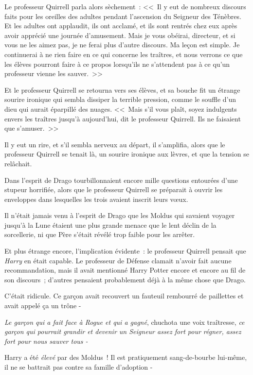 Le professeur Quirrell parla alors sèchement~: <<~Il y eut de nombreux discours faits pour les oreilles des adultes pendant l'ascension du Seigneur des Ténèbres. Et les adultes ont applaudit, ils ont acclamé, et ils sont rentrés chez eux après avoir apprécié une journée d'amusement. Mais je vous obéirai, directeur, et si vous ne les aimez pas, je ne ferai plus d'autre discours. Ma leçon est simple. Je continuerai à ne rien faire en ce qui concerne les traîtres, et nous verrons ce que les élèves pourront faire à ce propos lorsqu'ils ne s'attendent pas à ce qu'un professeur vienne les sauver.~>>

Et le professeur Quirrell se retourna vers ses élèves, et sa bouche fit un étrange sourire ironique qui sembla dissiper la terrible pression, comme le souffle d'un dieu qui aurait éparpillé des nuages. <<~Mais s'il vous plaît, soyez indulgents envers les traîtres jusqu'à aujourd'hui, dit le professeur Quirrell. Ils ne faisaient que s'amuser.~>>

Il y eut un rire, et s'il sembla nerveux au départ, il s'amplifia, alors que le professeur Quirrell se tenait là, un sourire ironique aux lèvres, et que la tension se relâchait.

\later

Dans l'esprit de Drago tourbillonnaient encore mille questions entourées d'une stupeur horrifiée, alors que le professeur Quirrell se préparait à ouvrir les enveloppes dans lesquelles les trois avaient inscrit leurs vœux.

Il n'était jamais venu à l'esprit de Drago que les Moldus qui savaient voyager jusqu'à la Lune étaient une plus grande menace que le lent déclin de la sorcellerie, ni que Père s'était révélé trop faible pour les arrêter.

Et plus étrange encore, l'implication évidente~: le professeur Quirrell pensait que \emph{Harry} en était capable. Le professeur de Défense clamait n'avoir fait aucune recommandation, mais il avait mentionné Harry Potter encore et encore au fil de son discours~; d'autres pensaient probablement déjà à la même chose que Drago.

C'était ridicule. Ce garçon avait recouvert un fauteuil rembourré de paillettes et avait appelé ça un trône -

\emph{Le garçon qui a fait face à Rogue et qui a gagné}, chuchota une voix traîtresse, \emph{ce garçon qui pourrait grandir et devenir un Seigneur assez fort pour régner, assez fort pour nous sauver tous -}

Harry a été \emph{élevé} par des Moldus~! Il est pratiquement sang-de-bourbe lui-même, il ne se battrait pas contre sa famille d'adoption -

